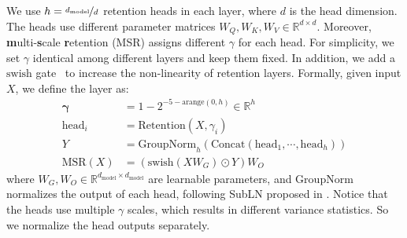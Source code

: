 \documentclass{article}
\begin{document}
We use $h = \nicefrac{d_\text{model}}{d}$ retention heads in each layer, where $d$ is the head dimension. The heads use different parameter matrices $W_Q, W_K, W_V \in \mathbb{R}^{d\times d}$.
Moreover, \textbf{m}ulti-\textbf{s}cale \textbf{r}etention (MSR) assigns different $\gamma$ for each head. For simplicity, we set $\gamma$ identical among different layers and keep them fixed.
In addition, we add a $\mathrm{swish}$ gate~\cite{gelu,swish} to increase the non-linearity of retention layers.
Formally, given input $X$, we define the layer as:
\begin{equation}
\begin{aligned}
\label{eq:msr}
\mathbf{\gamma} &= 1 - 2^{-5-\mathrm{arange}(0, h)} \in \mathbb{R}^{h} \\
\mathrm{head}_i &= \mathrm{Retention}(X, \gamma_i) \\
Y &= \mathrm{GroupNorm}_{h}( \mathrm{Concat}(\mathrm{head}_1, \cdots, \mathrm{head}_h) ) \\
\mathrm{MSR}(X) &= (\mathrm{swish}(X W_G) \odot Y) W_O
\end{aligned}
\end{equation}
where $W_G, W_O \in \mathbb{R}^{d_\text{model}\times d_\text{model}}$ are learnable parameters, and $\mathrm{GroupNorm}$~\cite{groupnorm} normalizes the output of each head, following SubLN proposed in \cite{megatron}.
Notice that the heads use multiple $\gamma$ scales, which results in different variance statistics. So we normalize the head outputs separately.
\end{document}
